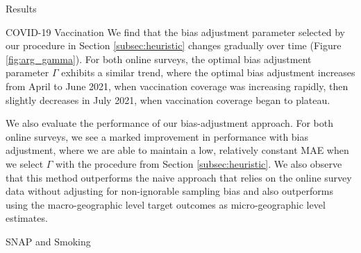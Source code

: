 \begin{subsection}{Results}

\begin{subsubsection}{COVID-19 Vaccination}
We find that the bias adjustment parameter selected by our procedure in Section \ref{subsec:heuristic} changes gradually over time (Figure \ref{fig:arg_gamma}). For both online surveys, the optimal bias adjustment parameter $\Gamma$ exhibits a similar trend, where the optimal bias adjustment increases from April to June 2021, when vaccination coverage was increasing rapidly, then slightly decreases in July 2021, when vaccination coverage began to plateau. 

We also evaluate the performance of our bias-adjustment approach. For both online surveys, we see a marked improvement in performance with bias adjustment, where we are able to maintain a low, relatively constant MAE when we select $\Gamma$ with the procedure from Section \ref{subsec:heuristic}. We also observe that this method outperforms the naive approach that relies on the online survey data without adjusting for non-ignorable sampling bias and also outperforms using the macro-geographic level target outcomes as micro-geographic level estimates.


\end{subsubsection}

\begin{subsubsection}{SNAP and Smoking}

\end{subsubsection}

\end{subsection}
